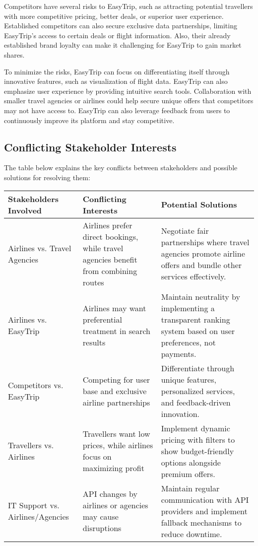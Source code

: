Competitors have several risks to EasyTrip, such as attracting potential travellers with more competitive pricing, better deals, or superior user experience. Established competitors can also secure exclusive data partnerships, limiting EasyTrip’s access to certain deals or flight information. Also, their already established brand loyalty can make it challenging for EasyTrip to gain market shares.



To minimize the risks, EasyTrip can focus on differentiating itself through innovative features, such as visualization of flight data. EasyTrip can also emphasize user experience by providing intuitive search tools. Collaboration with smaller travel agencies or airlines could help secure unique offers that competitors may not have access to. EasyTrip can also leverage feedback from users to continuously improve its platform and stay competitive.


\subsection{Conflicting Stakeholder Interests}
The table below explains the key conflicts between stakeholders and possible solutions for resolving them:

\begin{longtable}{|p{4cm}|p{6cm}|p{6cm}|}
    \hline
    \rowcolor{headergray}
    \textbf{Stakeholders Involved} & \textbf{Conflicting Interests} & \textbf{Potential Solutions} \\ \hline
    Airlines vs. Travel Agencies & Airlines prefer direct bookings, while travel agencies benefit from combining routes & Negotiate fair partnerships where travel agencies promote airline offers and bundle other services effectively. \\ \hline
    Airlines vs. EasyTrip & Airlines may want preferential treatment in search results & Maintain neutrality by implementing a transparent ranking system based on user preferences, not payments. \\ \hline
    Competitors vs. EasyTrip & Competing for user base and exclusive airline partnerships & Differentiate through unique features, personalized services, and feedback-driven innovation. \\ \hline
    Travellers vs. Airlines & Travellers want low prices, while airlines focus on maximizing profit & Implement dynamic pricing with filters to show budget-friendly options alongside premium offers. \\ \hline
    IT Support vs. Airlines/Agencies & API changes by airlines or agencies may cause disruptions & Maintain regular communication with API providers and implement fallback mechanisms to reduce downtime. \\ \hline
\end{longtable}

